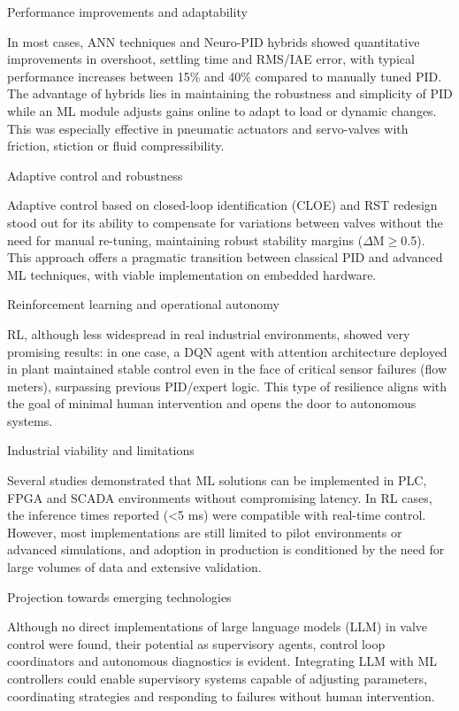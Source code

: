 \documentclass{article}
\begin{document}
Performance improvements and adaptability

In most cases, ANN techniques and Neuro-PID hybrids showed quantitative improvements in overshoot, settling time and RMS/IAE error, with typical 
performance increases between 15\% and 40\% compared to manually tuned PID. The advantage of hybrids lies in maintaining the robustness and simplicity of PID while an ML module 
adjusts gains online to adapt to load or dynamic changes. This was especially effective in pneumatic actuators and servo-valves with friction, 
stiction or fluid compressibility.

Adaptive control and robustness

Adaptive control based on closed-loop identification (CLOE) and RST redesign stood out for its ability to compensate for variations between valves without the need for 
manual re-tuning, maintaining robust stability margins ($\Delta$M$\geq$0.5). This approach offers a pragmatic transition between classical PID and advanced ML techniques, with 
viable implementation on embedded hardware.

Reinforcement learning and operational autonomy

RL, although less widespread in real industrial environments, showed very promising results: in one case, a DQN agent with attention architecture deployed in plant 
maintained stable control even in the face of critical sensor failures (flow meters), surpassing previous PID/expert logic. This type of resilience aligns with the goal of 
minimal human intervention and opens the door to autonomous systems.

Industrial viability and limitations

Several studies demonstrated that ML solutions can be implemented in PLC, FPGA and SCADA environments without compromising latency. In RL cases, the inference times 
reported (<5 ms) were compatible with real-time control. However, most implementations are still limited to pilot environments or advanced simulations, and 
adoption in production is conditioned by the need for large volumes of data and extensive validation.

Projection towards emerging technologies

Although no direct implementations of large language models (LLM) in valve control were found, their potential as supervisory agents, control loop coordinators 
and autonomous diagnostics is evident. Integrating LLM with ML controllers could enable supervisory systems capable of adjusting parameters, coordinating strategies 
and responding to failures without human intervention.
\end{document}
